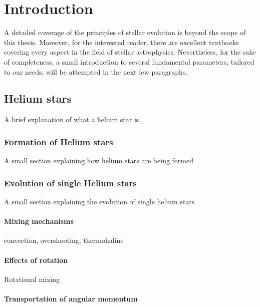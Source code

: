 \documentclass[../../main/thesis_msc.tex]{subfiles}
\begin{document}
    \chapter{Introduction}
    
		A detailed coverage of the principles of stellar evolution is beyond the scope of this thesis. Moreover, for the interested reader, there are excellent textbooks \citep{Kipp_book, Clayton} covering every aspect in the field of stellar astrophysics. Nevertheless, for the sake of completeness, a small introduction to several fundamental parameters, tailored to our needs, will be attempted in the next few paragraphs. 
		
    
    
    \section{Helium stars}
    	
    	A brief explanation of what a helium star is


			\subsection{Formation of Helium stars}
			
				A small section explaining how helium stars are being formed
				
			
			\subsection{Evolution of single Helium stars}
			
				A small section explaining the evolution of single helium stars    	
				
					\subsubsection{Mixing mechanisms}
					
						convection, overshooting, thermohaline
						
					\subsubsection{Effects of rotation}
					
						Rotational mixing 
						
					\subsubsection{Transportation of angular momentum}
					
\end{document}
